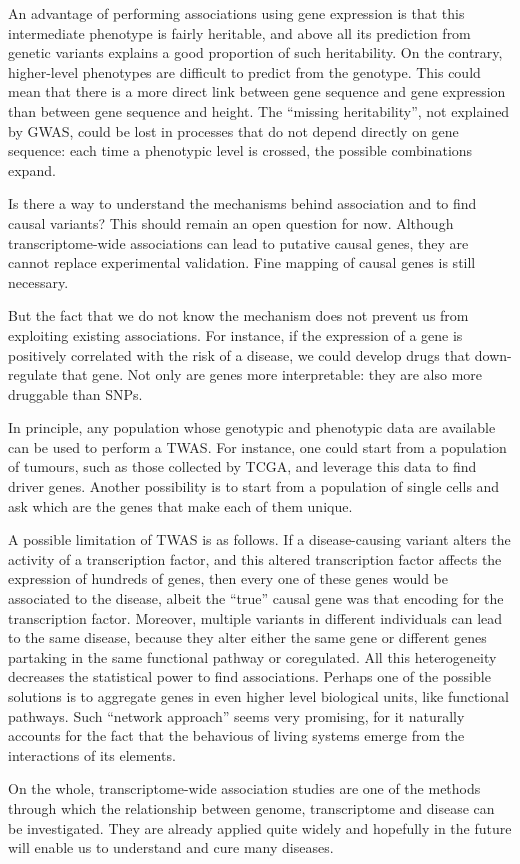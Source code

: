 \documentclass[../main.tex]{subfiles}
\begin{document}
An advantage of performing associations using gene expression is that 
this intermediate phenotype is fairly heritable, and above all its 
prediction from genetic variants explains a good proportion of such 
heritability. On the contrary, higher-level phenotypes are difficult to 
predict from the genotype. This could mean that there is a more direct 
link between gene sequence and gene expression than between gene 
sequence and height. The \enquote{missing heritability}, not explained 
by GWAS, could be lost in processes that do not depend directly on gene 
sequence: each time a phenotypic level is crossed, the possible 
combinations expand.

Is there a way to understand the mechanisms behind association and to 
find causal variants? This should remain an open question for now. 
Although transcriptome-wide associations can lead to putative causal 
genes, they are cannot replace experimental validation. Fine mapping of 
causal genes is still necessary.

But the fact that we do not know the mechanism does not prevent us from 
exploiting existing associations. For instance, if the expression of a 
gene is positively correlated with the risk of a disease, we could 
develop drugs that down-regulate that gene. Not only are genes more 
interpretable: they are also more druggable than SNPs.

In principle, any population whose genotypic and phenotypic data are 
available can be used to perform a TWAS. For instance, one could start 
from a population of tumours, such as those collected by TCGA, and 
leverage this data to find driver genes. Another possibility is to start 
from a population of single cells and ask which are the genes that make 
each of them unique.

A possible limitation of TWAS is as follows. If a disease-causing 
variant alters the activity of a transcription factor, and this altered 
transcription factor affects the expression of hundreds of genes, then 
every one of these genes would be associated to the disease, albeit the 
\enquote{true} causal gene was that encoding for the transcription 
factor. Moreover, multiple variants in different individuals can lead to 
the same disease, because they alter either the same gene or different 
genes partaking in the same functional pathway or coregulated. All this 
heterogeneity decreases the statistical power to find associations. 
Perhaps one of the possible solutions is to aggregate genes in even 
higher level biological units, like functional pathways. Such 
\enquote{network approach} seems very promising, for it naturally 
accounts for the fact that the behavious of living systems emerge from 
the interactions of its elements.

On the whole, transcriptome-wide association studies are one of the 
methods through which the relationship between genome, transcriptome and 
disease can be investigated. They are already applied quite widely and 
hopefully in the future will enable us to understand and cure many 
diseases.
\end{document}
